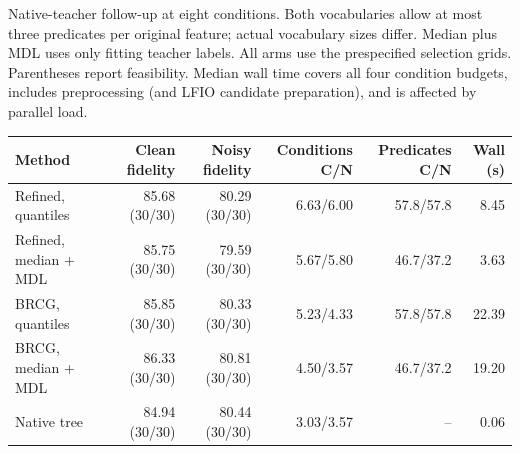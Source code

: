 \begin{kbtable}
\centering
\caption{Native-teacher follow-up at eight conditions. Both vocabularies allow at most three predicates per original feature; actual vocabulary sizes differ. Median plus MDL uses only fitting teacher labels. All arms use the prespecified selection grids. Parentheses report feasibility. Median wall time covers all four condition budgets, includes preprocessing (and LFIO candidate preparation), and is affected by parallel load.}
\label{tab:checklist_vocabulary}
\small
\begin{adjustbox}{max width=\linewidth}
\begin{tabular}{lrrrrr}
\toprule
Method & Clean fidelity & Noisy fidelity & Conditions C/N & Predicates C/N & Wall (s) \\
\midrule
Refined, quantiles & 85.68 (30/30) & 80.29 (30/30) & 6.63/6.00 & 57.8/57.8 & 8.45 \\
Refined, median + MDL & 85.75 (30/30) & 79.59 (30/30) & 5.67/5.80 & 46.7/37.2 & 3.63 \\
BRCG, quantiles & 85.85 (30/30) & 80.33 (30/30) & 5.23/4.33 & 57.8/57.8 & 22.39 \\
BRCG, median + MDL & 86.33 (30/30) & 80.81 (30/30) & 4.50/3.57 & 46.7/37.2 & 19.20 \\
Native tree & 84.94 (30/30) & 80.44 (30/30) & 3.03/3.57 & -- & 0.06 \\
\bottomrule
\end{tabular}
\end{adjustbox}
\end{kbtable}
